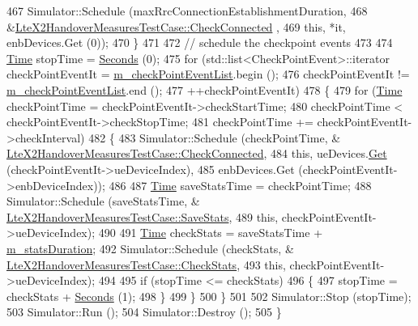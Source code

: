 \begin{DoxyCode}
467       Simulator::Schedule (maxRrcConnectionEstablishmentDuration,
468                            &\hyperlink{classLteX2HandoverMeasuresTestCase_afaab3497c199b4440d286d0cb19996f3}{LteX2HandoverMeasuresTestCase::CheckConnected}
      ,
469                            \textcolor{keyword}{this}, *it, enbDevices.Get (0));
470     \}
471 
472   \textcolor{comment}{// schedule the checkpoint events}
473 
474   \hyperlink{classns3_1_1Time}{Time} stopTime = \hyperlink{group__timecivil_ga33c34b816f8ff6628e33d5c8e9713b9e}{Seconds} (0);
475   \textcolor{keywordflow}{for} (std::list<CheckPointEvent>::iterator checkPointEventIt = 
      \hyperlink{classLteX2HandoverMeasuresTestCase_a2bd309a4202b3f5d7f1978f8b9427478}{m\_checkPointEventList}.begin ();
476        checkPointEventIt != \hyperlink{classLteX2HandoverMeasuresTestCase_a2bd309a4202b3f5d7f1978f8b9427478}{m\_checkPointEventList}.end ();
477        ++checkPointEventIt)
478     \{
479       \textcolor{keywordflow}{for} (\hyperlink{classns3_1_1Time}{Time} checkPointTime = checkPointEventIt->checkStartTime;
480            checkPointTime < checkPointEventIt->checkStopTime;
481            checkPointTime += checkPointEventIt->checkInterval)
482         \{
483           Simulator::Schedule (checkPointTime, &
      \hyperlink{classLteX2HandoverMeasuresTestCase_afaab3497c199b4440d286d0cb19996f3}{LteX2HandoverMeasuresTestCase::CheckConnected},
484                                \textcolor{keyword}{this}, ueDevices.\hyperlink{classns3_1_1NetDeviceContainer_a677d62594b5c9d2dea155cc5045f4d0b}{Get} (checkPointEventIt->ueDeviceIndex),
485                                enbDevices.Get (checkPointEventIt->enbDeviceIndex));
486 
487           \hyperlink{classns3_1_1Time}{Time} saveStatsTime = checkPointTime;
488           Simulator::Schedule (saveStatsTime, &
      \hyperlink{classLteX2HandoverMeasuresTestCase_abac5d644fc33677767c1d0b135c12fcc}{LteX2HandoverMeasuresTestCase::SaveStats},
489                                \textcolor{keyword}{this}, checkPointEventIt->ueDeviceIndex);
490 
491           \hyperlink{classns3_1_1Time}{Time} checkStats = saveStatsTime + \hyperlink{classLteX2HandoverMeasuresTestCase_a71c9a56babae7f1292626c29c8e376a2}{m\_statsDuration};
492           Simulator::Schedule (checkStats, &
      \hyperlink{classLteX2HandoverMeasuresTestCase_a6894b43af877258dc079c609e36ebb60}{LteX2HandoverMeasuresTestCase::CheckStats},
493                                \textcolor{keyword}{this}, checkPointEventIt->ueDeviceIndex);
494 
495           \textcolor{keywordflow}{if} (stopTime <= checkStats)
496             \{
497               stopTime = checkStats + \hyperlink{group__timecivil_ga33c34b816f8ff6628e33d5c8e9713b9e}{Seconds} (1);
498             \}
499         \}
500     \}
501 
502   Simulator::Stop (stopTime);
503   Simulator::Run ();
504   Simulator::Destroy ();
505 \}
\end{DoxyCode}


